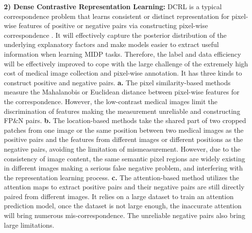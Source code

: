 \textbf{2) Dense Contrastive Representation Learning:} DCRL is a typical correspondence problem that learns consistent or distinct representation for pixel-wise features of positive or negative pairs via constructing pixel-wise correspondence \cite{milbich2021visual,zhang2022attributable,roth2020pads}. It will effectively capture the posterior distribution of the underlying explanatory factors and make models easier to extract useful information \cite{bengio2013representation} when learning MIDP tasks. Therefore, the label and data efficiency will be effectively improved to cope with the large challenge of the extremely high cost of medical image collection and pixel-wise annotation. It has three kinds to construct positive and negative pairs. \textbf{a.} The pixel similarity-based methods \cite{wang2022densecl,li2021dense,xie2021propagate,chen2021unsupervised,gao2022unsupervised} measure the Mahalanobis \cite{de2000mahalanobis} or Euclidean \cite{wang2005euclidean} distance between pixel-wise features for the correspondence. However, the low-contrast medical images limit the discrimination of features making the measurement unreliable and constructing FP\&N pairs. \textbf{b.} The location-based methods take the shared part of two cropped patches from one image\cite{o2020unsupervised} or the same position between two medical images \cite{chaitanya2020contrastive} as the positive pairs and the features from different images or different positions as the negative pairs, avoiding the limitation of mismeasurement. However, due to the consistency of image content, the same semantic pixel regions are widely existing in different images making a serious false negative problem, and interfering with the representation learning process. \textbf{c.} The attention-based method \cite{wang2022exploring} utilizes the attention maps to extract positive pairs and their negative pairs are still directly paired from different images. It relies on a large dataset to train an attention prediction model, once the dataset is not large enough, the inaccurate attention will bring numerous mis-correspondence. The unreliable negative pairs also bring large limitations.

